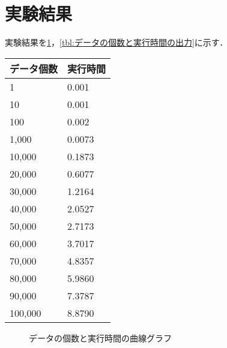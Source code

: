 \section{実験結果}
実験結果を\ref{fig:データの個数と実行時間の曲線グラフ}，\ref{tbl:データの個数と実行時間の出力}に示す．\\
\begin{minipage}{0.3\textwidth}
    \centering
    \begin{tabular}{ll}
        \multicolumn{1}{c}{データ個数} & \multicolumn{1}{c}{実行時間} \\
        \hline
        1                         & 0.001                    \\
        10                        & 0.001                    \\
        100                       & 0.002                    \\
        1,000                     & 0.0073                   \\
        10,000                    & 0.1873                   \\
        20,000                    & 0.6077                   \\
        30,000                    & 1.2164                   \\
        40,000                    & 2.0527                   \\
        50,000                    & 2.7173                   \\
        60,000                    & 3.7017                   \\
        70,000                    & 4.8357                   \\
        80,000                    & 5.9860                   \\
        90,000                    & 7.3787                   \\
        100,000                   & 8.8790                   \\
        \hline
    \end{tabular}
\end{minipage}
\begin{figure}[h]
    \centering
    \caption{データの個数と実行時間の曲線グラフ}
    \label{fig:データの個数と実行時間の曲線グラフ}
\end{figure}
